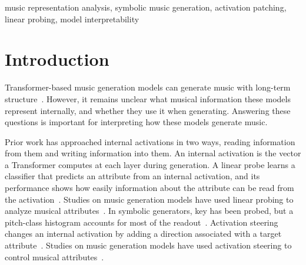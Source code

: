 \documentclass{article}
\begin{document}
\begin{keywords}
music representation analysis, symbolic music generation, activation patching, linear probing, model interpretability
\end{keywords}

\section{Introduction}
Transformer-based music generation models can generate music with long-term structure~\cite{huang2019musictransformer,thickstun2023anticipatory,dong2023mmt}.
However, it remains unclear what musical information these models represent internally, and whether they use it when generating.
Answering these questions is important for interpreting how these models generate music.

Prior work has approached internal activations in two ways, reading information from them and writing information into them.
An internal activation is the vector a Transformer computes at each layer during generation.
A linear probe learns a classifier that predicts an attribute from an internal activation, and its performance shows how easily information about the attribute can be read from the activation~\cite{alain2017probes,belinkov2022probing}.
Studies on music generation models have used linear probing to analyze musical attributes~\cite{syntheory2024,ma2024root}.
In symbolic generators, key has been probed, but a pitch-class histogram accounts for most of the readout~\cite{mimidi2026}.
Activation steering changes an internal activation by adding a direction associated with a target attribute~\cite{li2023iti,zou2023repe}.
Studies on music generation models have used activation steering to control musical attributes~\cite{smitin2024,facchiano2025patching,musicrfm2026,singh2026discovering,mimidi2026}.
\end{document}
